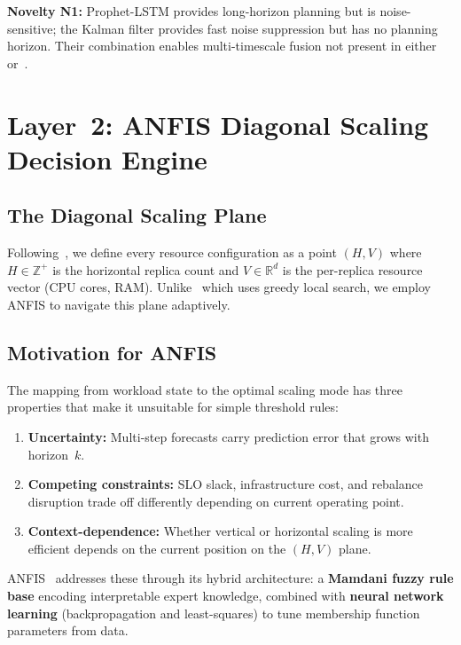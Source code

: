 \documentclass[conference]{IEEEtran}
\begin{document}
\textbf{Novelty N1:} Prophet-LSTM provides long-horizon planning but is noise-sensitive; the Kalman filter provides fast noise suppression but has no planning horizon. Their combination enables multi-timescale fusion not present in either~\cite{guruge2025time} or~\cite{gu2025hasgpu}.

\section{Layer~2: ANFIS Diagonal Scaling Decision Engine}
\label{sec:layer2}

\subsection{The Diagonal Scaling Plane}

Following~\cite{abdullah2025diagonal}, we define every resource configuration as a point $(H, V)$ where $H \in \mathbb{Z}^+$ is the horizontal replica count and $V \in \mathbb{R}^d$ is the per-replica resource vector (CPU cores, RAM). Unlike~\cite{abdullah2025diagonal} which uses greedy local search, we employ ANFIS to navigate this plane adaptively.

\subsection{Motivation for ANFIS}

The mapping from workload state to the optimal scaling mode has three properties that make it unsuitable for simple threshold rules:

\begin{enumerate}
    \item \textbf{Uncertainty:} Multi-step forecasts carry prediction error that grows with horizon~$k$.
    \item \textbf{Competing constraints:} SLO slack, infrastructure cost, and rebalance disruption trade off differently depending on current operating point.
    \item \textbf{Context-dependence:} Whether vertical or horizontal scaling is more efficient depends on the current position on the $(H, V)$ plane.
\end{enumerate}

ANFIS~\cite{jang1993anfis} addresses these through its hybrid architecture: a \textbf{Mamdani fuzzy rule base} encoding interpretable expert knowledge, combined with \textbf{neural network learning} (backpropagation and least-squares) to tune membership function parameters from data.
\end{document}
